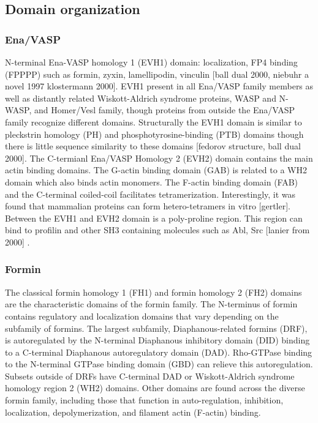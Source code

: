 \subsection{Domain organization}\label{ena-formin-domains}

\subsubsection{Ena/VASP}
N-terminal Ena-VASP homology 1 (EVH1) domain: localization, FP4 binding (FPPPP) such as formin, zyxin, lamellipodin, vinculin [ball dual 2000, niebuhr a novel 1997 klostermann 2000].
EVH1 present in all Ena/VASP family members as well as distantly related Wiskott-Aldrich syndrome proteins, WASP and N-WASP, and Homer/Vesl family, though proteins from outside the Ena/VASP family recognize different domains. Structurally the EVH1 domain is similar to pleckstrin homology (PH) and phosphotyrosine-binding (PTB) domains though there is little sequence similarity to these domains \citep{prehoda_structure_1999,reinhard_actin-based_2001} [fedorov structure, ball dual 2000].
The C-termianl Ena/VASP Homology 2 (EVH2) domain contains the main actin binding domains. The G-actin binding domain (GAB) is related to a WH2 domain which also binds actin monomers. The F-actin binding domain (FAB) and the C-terminal coiled-coil facilitates tetramerization. Interestingly, it was found that mammalian proteins can form hetero-tetramers in vitro [gertler]. 
Between the EVH1 and EVH2 domain is a poly-proline region. This region can bind to profilin and other SH3 containing molecules such as Abl, Src [lanier from 2000] \citep{gertler_mena_1996}.

\subsubsection{Formin}
The classical formin homology 1 (FH1) and formin homology 2 (FH2) domains are the characteristic  domains of the formin family. The N-terminus of formin contains regulatory and localization domains that vary depending on the subfamily of formins. The largest subfamily, Diaphanous-related formins (DRF), is autoregulated by the N-terminal Diaphanous inhibitory domain (DID) binding to a C-terminal Diaphanous autoregulatory domain (DAD).  Rho-GTPase binding to the N-terminal GTPase binding domain (GBD) can relieve this autoregulation. Subsets outside of DRFs have C-terminal DAD or Wiskott-Aldrich syndrome homology region 2 (WH2) domains. Other domains are found across the diverse formin family, including those that function in auto-regulation, inhibition, localization, depolymerization, and filament actin (F-actin) binding.


